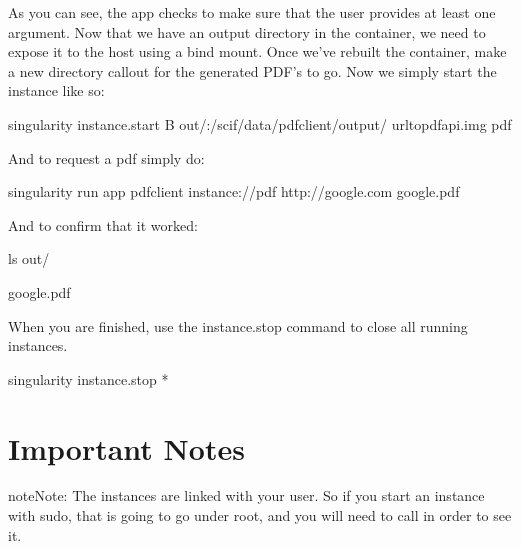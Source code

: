 \documentclass[letterpaper,10pt,english]{sphinxmanual}
\begin{document}
As you can see, the  app checks to make sure that the user provides at
least one argument. Now that we have an output directory in the
container, we need to expose it to the host using a bind mount. Once
we’ve rebuilt the container, make a new directory callout  for the
generated PDF’s to go. Now we simply start the instance like so:

%
\begin{sphinxVerbatim}[commandchars=\\\{\}]
\PYGZdl{} singularity instance.start \PYGZhy{}B out/:/scif/data/pdf\PYGZus{}client/output/ url\PYGZhy{}to\PYGZhy{}pdf\PYGZhy{}api.img pdf
\end{sphinxVerbatim}

And to request a pdf simply do:

%
\begin{sphinxVerbatim}[commandchars=\\\{\}]
\PYGZdl{} singularity run \PYGZhy{}\PYGZhy{}app pdf\PYGZus{}client instance://pdf http://google.com google.pdf
\end{sphinxVerbatim}

And to confirm that it worked:

%
\begin{sphinxVerbatim}[commandchars=\\\{\}]
\PYGZdl{} ls out/

google.pdf
\end{sphinxVerbatim}

When you are finished, use the instance.stop command to close all
running instances.

%
\begin{sphinxVerbatim}[commandchars=\\\{\}]
\PYGZdl{} singularity instance.stop \PYGZbs{}*
\end{sphinxVerbatim}


\section{Important Notes}
\label{\detokenize{running_services:important-notes}}
\begin{sphinxadmonition}{note}{Note:}
The instances are linked with your user. So if you start an instance
with sudo, that is going to go under root, and you will need to call 
in order to see it.
\end{sphinxadmonition}
\end{document}
